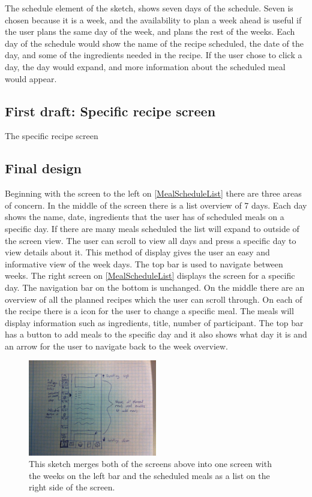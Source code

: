 The schedule element of the sketch, shows seven days of the schedule. Seven is chosen because it is a week, and the availability to plan a week ahead is useful if the user plans the same day of the week, and plans the rest of the weeks. Each day of the schedule would show the name of the recipe scheduled, the date of the day, and some of the ingredients needed in the recipe. If the user chose to click a day, the day would expand, and more information about the scheduled meal would appear.

\subsection{First draft: Specific recipe screen}

The specific recipe screen

\subsection{Final design}


Beginning with the screen to the left on \cref{MealScheduleList} there are three areas of concern. In the middle of the screen there is a list overview of 7 days. Each day shows the name, date, ingredients that the user has of scheduled meals on a specific day. If there are many meals scheduled the list will expand to outside of the screen view. The user can scroll to view all days and press a specific day to view details about it. This method of display gives the user an easy and informative view of the week days. The top bar is used to navigate between weeks. The right screen on \cref{MealScheduleList} displays the screen for a specific day. The navigation bar on the bottom is unchanged. On the middle there are an overview of all the planned recipes which the user can scroll through. On each of the recipe there is a icon for the user to change a specific meal. The meals will display information such as ingredients, title, number of participant. The top bar has a button to add meals to the specific day and it also shows what day it is and an arrow for the user to navigate back to the week overview.  

\begin{figure}[H]
	\centering
    \includegraphics[width=0.5\textwidth]{Grafik/FoodPlanner/FinalMealScheduleSketch2}
	\caption{This sketch merges both of the screens above into one screen with the weeks on the left bar and the scheduled meals as a list on the right side of the screen.}
	\label{MealScheduleBar}
\end{figure}

